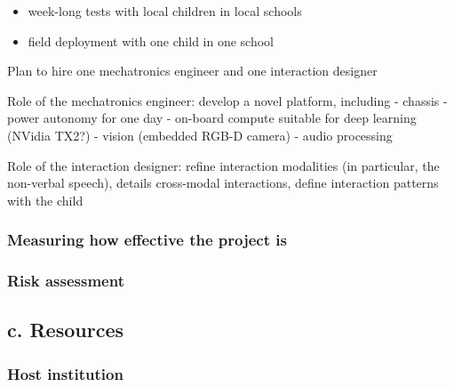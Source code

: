 \documentclass[11pt]{article}
\begin{document}
\begin{itemize}
    \item week-long tests with local children in local schools
    \item field deployment with one child in one school
\end{itemize}


Plan to hire one mechatronics engineer and one interaction designer

Role of the mechatronics engineer: develop a novel platform, including -
chassis - power autonomy for one day - on-board compute suitable for
deep learning (NVidia TX2?) - vision (embedded RGB-D camera) - audio
processing

Role of the interaction designer: refine interaction modalities (in
particular, the non-verbal speech), details cross-modal interactions,
define interaction patterns with the child

\hypertarget{measuring-how-effective-the-project-is}{%
\subsubsection{Measuring how effective the project
is}\label{measuring-how-effective-the-project-is}}








\hypertarget{risk-assessment}{%
\subsubsection{Risk assessment}\label{risk-assessment}}

\hypertarget{c.-resources}{%
\subsection{c. Resources}\label{c.-resources}}

\hypertarget{host-institution}{%
\subsubsection{Host institution}\label{host-institution}}
\end{document}
